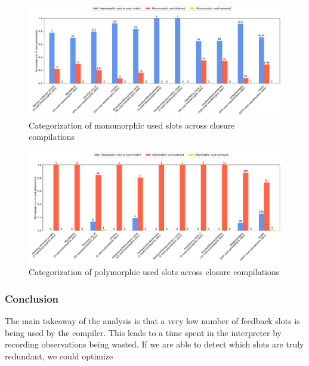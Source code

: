 \begin{figure}
	\centering
	\begin{adjustwidth}{-3cm}{-3cm}
		\includegraphics[width=1.5\textwidth]{figures/used_mono.pdf}
	\end{adjustwidth}
	\caption{Categorization of monomorphic used slots across closure compilations}\label{fig:graph-used-mono}
\end{figure}

\begin{figure}
	\centering
	\begin{adjustwidth}{-3cm}{-3cm}
		\includegraphics[width=1.5\textwidth]{figures/used_poly.pdf}
	\end{adjustwidth}
	\caption{Categorization of polymorphic used slots across closure compilations}\label{fig:graph-used-poly}
\end{figure}

\subsubsection*{Conclusion}

The main takeaway of the analysis is that a very low number of feedback slots is being used by the compiler. This leads to a time spent in the interpreter by recording observations being wasted. If we are able to detect which slots are truly redundant, we could optimize

